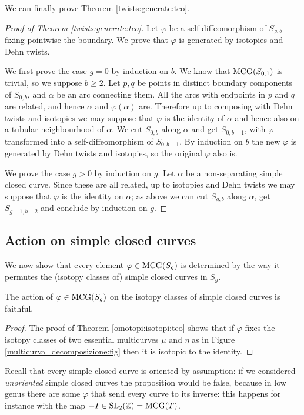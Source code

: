 We can finally prove Theorem \ref{twists:generate:teo}.
\begin{proof}[Proof of Theorem \ref{twists:generate:teo}]
Let $\varphi$ be a self-diffeomorphism of $S_{g,b}$ fixing pointwise the boundary. We prove that $\varphi$ is generated by isotopies and Dehn twists.

We first prove the case $g=0$ by induction on $b$. We know that ${\rm MCG}(S_{0,1})$ is trivial, so we suppose $b\geqslant 2$. Let $p,q$ be points in distinct boundary components of $S_{0,b}$, and $\alpha$ be an arc connecting them. All the arcs with endpoints in $p$ and $q$ are related, and hence $\alpha$ and $\varphi(\alpha)$ are. Therefore up to composing with Dehn twists and isotopies we may suppose that $\varphi$ is the identity of $\alpha$ and hence also on a tubular neighbourhood of $\alpha$. We cut $S_{0,b}$ along $\alpha$ and get $S_{0,b-1}$, with $\varphi$ transformed into a self-diffeomorphism of $S_{0,b-1}$. By induction on $b$ the new $\varphi$ is generated by Dehn twists and isotopies, so the original $\varphi$ also is.

We prove the case $g>0$ by induction on $g$. Let $\alpha$ be a non-separating simple closed curve. Since these are all related, up to isotopies and Dehn twists we may suppose that $\varphi$ is the identity on $\alpha$; as above we can cut $S_{g,b}$ along $\alpha$, get $S_{g-1,b+2}$ and conclude by induction on $g$. 
\end{proof}

\subsection{Action on simple closed curves}
We now show that every element $\varphi\in{\rm MCG}(S_g)$ is determined by the way it permutes the (isotopy classes of) simple closed curves in $S_g$.

\begin{prop} \label{action:curves:prop}
The action of $\varphi\in{\rm MCG}(S_g)$ on the isotopy classes of simple closed curves is faithful.
\end{prop}
\begin{proof}
The proof of Theorem \ref{omotopi:isotopi:teo} shows that if $\varphi$ fixes the isotopy classes of two essential multicurves $\mu$ and $\eta$ as in Figure \ref{multicurva_decomposizione:fig} then it is isotopic to the identity.
\end{proof}

Recall that every simple closed curve is oriented by assumption: if we considered \emph{unoriented} simple closed curves the proposition would be false, because in low genus there are some $\varphi$ that send every curve to its inverse: this happens for instance with the map $-I \in {\rm SL}_2(\mathbb{Z}) = {\rm MCG}(T)$. 

